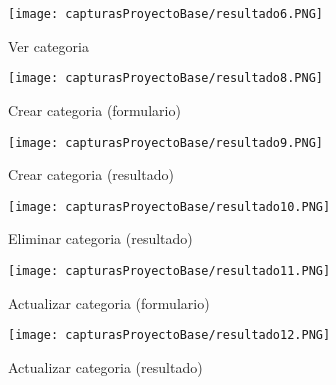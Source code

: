 \documentclass[titlepage, 12pt]{article}
\begin{document}
    \clearpage
    
    \begin{figure}[h]
        \caption{Ver categoria}
        \centering
        \texttt{[image: capturasProyectoBase/resultado6.PNG]} \par\vspace{0.5cm}
    \end{figure}
    
    \begin{figure}[h]
        \caption{Crear categoria (formulario)}
        \centering
        \texttt{[image: capturasProyectoBase/resultado8.PNG]} \par\vspace{0.5cm}
    \end{figure}
    
    \clearpage
    
    \begin{figure}[h]
        \caption{Crear categoria (resultado)}
        \centering
        \texttt{[image: capturasProyectoBase/resultado9.PNG]} \par\vspace{0.5cm}
    \end{figure}
    
    \begin{figure}[h]
        \caption{Eliminar categoria (resultado)}
        \centering
        \texttt{[image: capturasProyectoBase/resultado10.PNG]} \par\vspace{0.5cm}
    \end{figure}
    
    \clearpage
    
    \begin{figure}[h]
        \caption{Actualizar categoria (formulario)}
        \centering
        \texttt{[image: capturasProyectoBase/resultado11.PNG]} \par\vspace{0.5cm}
    \end{figure}
    
    \begin{figure}[h]
        \caption{Actualizar categoria (resultado)}
        \centering
        \texttt{[image: capturasProyectoBase/resultado12.PNG]} \par\vspace{0.5cm}
    \end{figure}
    
\end{document}
